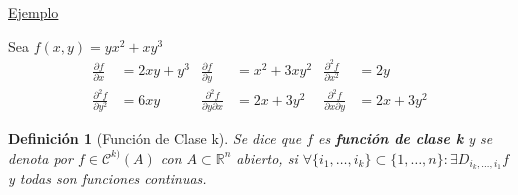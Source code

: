 \documentclass[10pt,a4paper,openright]{book}
\theoremstyle{break}
\newtheorem*{defi}{Definición}
\begin{document}
\underline{Ejemplo}

Sea $f(x,y)= yx^2 + xy^3$
\begin{align*}
\frac{\partial f}{\partial x} & = 2xy + y^3 & \frac{\partial f}{\partial y} & = x^2 + 3xy^2 & \frac{\partial^2 f}{\partial x^2} & = 2y \\ \frac{\partial^2 f}{\partial y^2} & = 6xy & \frac{\partial^2 f}{\partial y \partial x} & = 2x + 3y^2 & \frac{\partial^2 f}{ \partial x\partial y} & = 2x + 3y^2
\end{align*}

\begin{defi}[Función de Clase k]
Se dice que $f$ es \textbf{función de clase k} y se denota por $f \in \mathcal{C}^{k)} (A)$ con $A \subset \mathbb{R}^n$ abierto, si $\forall \{i_1, \ldots, i_k\} \subset \{1, \ldots, n\}: \exists D_{i_k, \ldots, i_1} f$ y todas son funciones continuas.
\end{defi}
\end{document}
